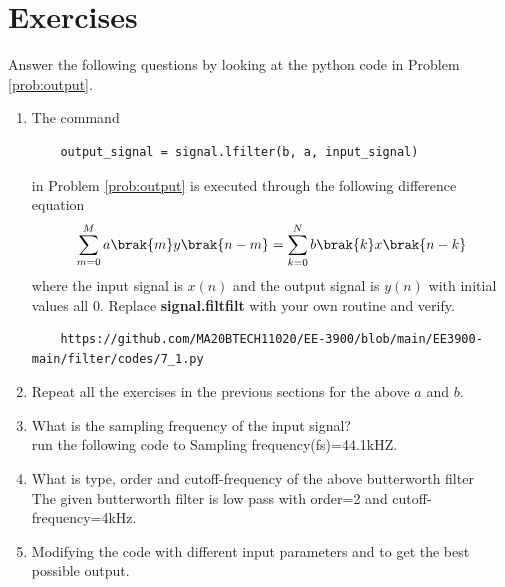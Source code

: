 \documentclass[journal,12pt,twocolumn]{IEEEtran}
\renewcommand\thesection{\arabic{section}}
\begin{document}
\section{Exercises}

Answer the following questions by looking at the python code in Problem \ref{prob:output}.
\begin{enumerate}[label=\thesection.\arabic*]
\item
The command
\begin{lstlisting}
	output_signal = signal.lfilter(b, a, input_signal)
	\end{lstlisting}
in Problem \ref{prob:output} is executed through the following difference equation
\begin{equation}
\label{eq:iir_filter_gen}
 \sum _{m=0}^{M}a\brak{m}y\brak{n-m}=\sum _{k=0}^{N}b\brak{k}x\brak{n-k}
\end{equation}
%
where the input signal is $x(n)$ and the output signal is $y(n)$ with initial values all 0. Replace
\textbf{signal.filtfilt} with your own routine and verify.
%
\solution 
\begin{lstlisting}
    https://github.com/MA20BTECH11020/EE-3900/blob/main/EE3900-main/filter/codes/7_1.py
\end{lstlisting}
\item Repeat all the exercises in the previous sections for the above $a$ and $b$.

\item What is the sampling frequency of the input signal?
\\
\solution run the following code to 
Sampling frequency(fs)=44.1kHZ.
\item
What is type, order and  cutoff-frequency of the above butterworth filter
\\
\solution
The given butterworth filter is low pass with order=2 and cutoff-frequency=4kHz.
%
\item
Modifying the code with different input parameters and to get the best possible output.
%
\end{enumerate}
\end{document}
